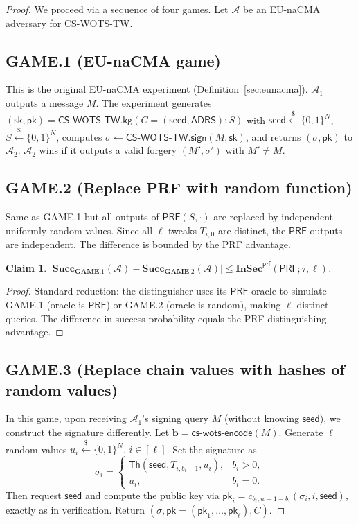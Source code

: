 \documentclass[11pt,a4paper]{article}
\newtheorem{claim}[theorem]{Claim}
\newcommand{\Th}{\mathsf{Th}}
\newcommand{\bits}{\{0,1\}}
\newcommand{\pk}{\mathsf{pk}}
\newcommand{\SK}{\mathsf{sk}}
\newcommand{\PK}{\mathsf{pk}}
\newcommand{\seed}{\mathsf{seed}}
\newcommand{\ADRS}{\mathsf{ADRS}}
\newcommand{\PRF}{\mathsf{PRF}}
\newcommand{\InSec}[1]{\mathbf{InSec}^{\mathsf{#1}}}
\newcommand{\Succ}{\mathbf{Succ}}
\newcommand{\GAME}{\mathbf{GAME}}
\newcommand{\Nbits}{N}
\begin{document}
\begin{proof}
We proceed via a sequence of four games. Let $\mathcal{A}$ be an EU-naCMA adversary for CS-WOTS-TW.

\subsection*{GAME.1 (EU-naCMA game)}
This is the original EU-naCMA experiment (Definition~\ref{sec:eunacma}). $\mathcal{A}_1$ outputs a message $M$. The experiment generates $(\SK,\PK) = \mathsf{CS\text{-}WOTS\text{-}TW.kg}(C = (\seed,\ADRS); S)$ with $\seed \xleftarrow{\$} \bits^\Nbits$, $S \xleftarrow{\$} \bits^\Nbits$, computes $\sigma \gets \mathsf{CS\text{-}WOTS\text{-}TW.sign}(M,\SK)$, and returns $(\sigma,\PK)$ to $\mathcal{A}_2$. $\mathcal{A}_2$ wins if it outputs a valid forgery $(M',\sigma')$ with $M' \neq M$.

\subsection*{GAME.2 (Replace PRF with random function)}
Same as GAME.1 but all outputs of $\PRF(S,\cdot)$ are replaced by independent uniformly random values. Since all $\ell$ tweaks $T_{i,0}$ are distinct, the $\PRF$ outputs are independent. The difference is bounded by the PRF advantage.

\begin{claim}
$|\Succ_{\GAME.1}(\mathcal{A}) - \Succ_{\GAME.2}(\mathcal{A})| \le \InSec{prf}(\PRF; \tau, \ell)$.
\end{claim}

\begin{proof}
Standard reduction: the distinguisher uses its $\PRF$ oracle to simulate GAME.1 (oracle is $\PRF$) or GAME.2 (oracle is random), making $\ell$ distinct queries. The difference in success probability equals the PRF distinguishing advantage.
\end{proof}

\subsection*{GAME.3 (Replace chain values with hashes of random values)}
In this game, upon receiving $\mathcal{A}_1$'s signing query $M$ (without knowing $\seed$), we construct the signature differently. Let $\mathbf{b} = \mathsf{cs\text{-}wots\text{-}encode}(M)$. Generate $\ell$ random values $u_i \xleftarrow{\$} \bits^\Nbits$, $i \in [\ell]$. Set the signature as
\[
\sigma_i = \begin{cases}
\Th(\seed, T_{i,b_i-1}, u_i), & b_i > 0,\\
u_i, & b_i = 0.
\end{cases}
\]
Then request $\seed$ and compute the public key via $\pk_i = c_{b_i, w-1-b_i}(\sigma_i, i, \seed)$, exactly as in verification. Return $(\sigma, \PK = (\pk_1,\ldots,\pk_\ell), C)$.


\end{proof}
\end{document}
